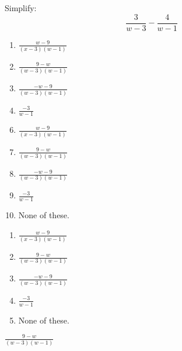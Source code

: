  
Simplify: $$ \frac{3}{w-3}-\frac{4}{w-1}$$


\ifsat
	\begin{enumerate}[label=\Alph*)]
		\item {\Large$\frac{w-9}{(x-3)(w-1)} $ }
		\item {\Large$\frac{9-w}{(w-3)(w-1)} $ } %
		\item {\Large$\frac{-w-9}{(w-3)(w-1)} $}
		\item {\Large$\frac{-3}{w-1} $}
	\end{enumerate}
\else
\fi

\ifacteven
	\begin{enumerate}[label=\textbf{\Alph*.},itemsep=\fill,align=left]
		\setcounter{enumii}{5}
		\item {\Large$\frac{w-9}{(x-3)(w-1)} $ }
		\item {\Large$\frac{9-w}{(w-3)(w-1)} $ } %
		\item {\Large$\frac{-w-9}{(w-3)(w-1)} $}
		\addtocounter{enumii}{1}
		\item {\Large$\frac{-3}{w-1} $}
		\item None of these. 
	\end{enumerate}
\else
\fi

\ifactodd
	\begin{enumerate}[label=\textbf{\Alph*.},itemsep=\fill,align=left]
		\item {\Large$\frac{w-9}{(x-3)(w-1)} $ }
		\item {\Large$\frac{9-w}{(w-3)(w-1)} $ } %
		\item {\Large$\frac{-w-9}{(w-3)(w-1)} $}
		\item {\Large$\frac{-3}{w-1} $}
		\item None of these. 
	\end{enumerate}
\else
\fi

\ifgridin
 {\Large$\frac{9-w}{(w-3)(w-1)} $ } %
		
\else
\fi

